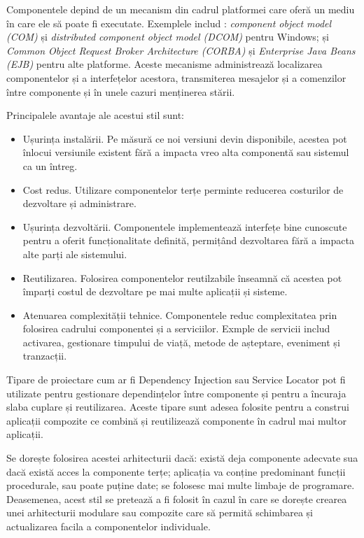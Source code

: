 \documentclass[12pt, a4paper, oneside, romanian]{teza-upb}
\begin{document}
Componentele depind de un mecanism din cadrul platformei care oferă un mediu în care ele să poate fi executate. Exemplele includ : \emph{component object model (COM)} și \emph{ distributed component object model (DCOM)} pentru Windows; și \emph{Common Object Request Broker Architecture (CORBA)} și \emph{Enterprise Java 	Beans (EJB)} pentru alte platforme. Aceste mecanisme administrează localizarea componentelor și a interfețelor acestora, transmiterea mesajelor și a comenzilor între componente și în unele cazuri menținerea stării.

Principalele avantaje ale acestui stil sunt:
\begin{itemize}
 \item Ușurința instalării. Pe măsură ce noi versiuni devin disponibile, acestea pot înlocui versiunile existent fără a impacta vreo alta componentă sau sistemul ca un întreg.
 \item Cost redus. Utilizare componentelor terțe perminte reducerea costurilor de dezvoltare și administrare.
 \item Ușurința dezvoltării. Componentele implementează interfețe bine cunoscute pentru a oferit funcționalitate definită, permițând dezvoltarea fără a impacta alte parți ale sistemului.
 \item Reutilizarea. Folosirea componentelor reutilzabile înseamnă că acestea pot împarți costul de dezvoltare pe mai multe aplicații și sisteme.
 \item Atenuarea complexității tehnice. Componentele reduc complexitatea prin folosirea cadrului componentei și a serviciilor. Exmple de servicii includ activarea, gestionare timpului de viață, metode de așteptare, eveniment și tranzacții.
\end{itemize}

Tipare de proiectare cum ar fi Dependency Injection sau Service Locator pot fi utilizate pentru gestionare dependințelor între componente și pentru a încuraja slaba cuplare și reutilizarea. Aceste tipare sunt adesea folosite pentru a construi aplicații compozite ce combină și reutilizează componente în cadrul mai multor aplicații.

Se dorește folosirea acestei arhitecturii dacă: există deja componente adecvate sua dacă există acces la componente terțe; aplicația va conține predominant funcții procedurale, sau poate puține date; se folosesc mai multe limbaje de programare. Deasemenea, acest stil se pretează a fi folosit în cazul în care se dorește crearea unei arhitecturii modulare sau compozite care să permită schimbarea și actualizarea facila a componentelor individuale.
\end{document}
